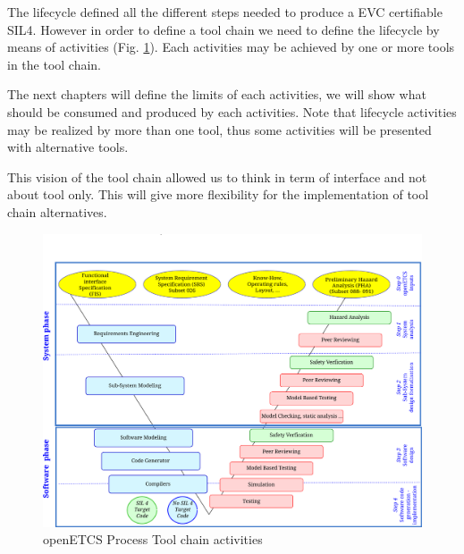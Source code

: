 The lifecycle defined all the different steps needed to produce a
\gls{EVC} certifiable SIL4. However in order to define a tool chain we
need to define the lifecycle by means of activities
(Fig. \ref{fig:openETCSActivities}). Each activities may be achieved by
one or more tools in the tool chain. 

The next chapters will define the limits of each activities, we will
show what should be consumed and produced by each activities. 
Note that lifecycle activities may be realized by more than one tool, thus some
activities will be presented with alternative tools.

This vision of the tool chain allowed us to think in term of interface
and not about tool only. This will give more flexibility for the
implementation of tool chain alternatives. 
\begin{figure}[htbp]
  \centering
  \includegraphics[width=\textwidth]{images/WholeProcess_Activities}
  \caption{openETCS Process Tool chain activities}
  \label{fig:openETCSActivities}
\end{figure}


